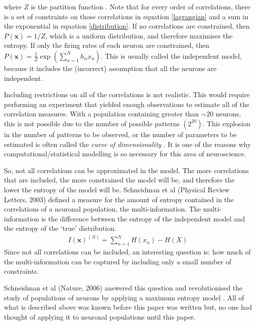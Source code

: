\documentclass[a4paper,12pt]{article}
\theoremstyle{definition}
\begin{document}
	where $Z$ is the partition function \cite{schneidman_2003}. Note that for every order of correlations, there is a set of constraints on those correlations in equation \ref{lagrangian} and a sum in the exponential in equation \ref{distribution}. If no correlations are constrained, then $P(\mathbf{x}) = 1/Z$, which is a uniform distribution, and therefore maximises the entropy. If only the firing rates of each neuron are constrained, then $P(\mathbf{x}) = \frac{1}{Z}\exp \left(\sum_{n=1}^N h_n x_n\right)$. This is usually called the independent model, because it includes the (incorrect) assumption that all the neurons are independent.
	
	Including restrictions on all of the correlations is not realistic. This would require performing an experiment that yielded enough observations to estimate all of the correlation measures. With a population containing greater than $\sim20$ neurons, this is not possible due to the number of possible patterns $(2^{20})$. This explosion in the number of patterns to be observed, or the number of parameters to be estimated is often called the \textit{curse of dimensionality} \cite{schneidman_2006}. It is one of the reasons why computational/statistical modelling is so necessary for this area of neuroscience.
	
	So, not all correlations can be approximated in the model. The more correlations that are included, the more constrained the model will be, and therefore the lower the entropy of the model will be. Schneidman et al (Physical Review Letters, 2003) defined a measure for the amount of entropy contained in the correlations of a neuronal population, the multi-information. The multi-information is the difference between the entropy of the independent model and the entropy of the `true' distribution.
	\begin{align}
	I(\mathbf{x})^{(N)} = \sum_{n=1}^N H(x_n) - H(X)
	\end{align}
	Since not all correlations can be included, an interesting question is: how much of the multi-information can be captured by including only a small number of constraints. 

	Schneidman et al (Nature, 2006) answered this question and revolutionised the study of populations of neurons by applying a maximum entropy model \cite{schneidman_2006}. All of what is described above was known before this paper was written but, no one had thought of applying it to neuronal populations until this paper. 
	
\end{document}
